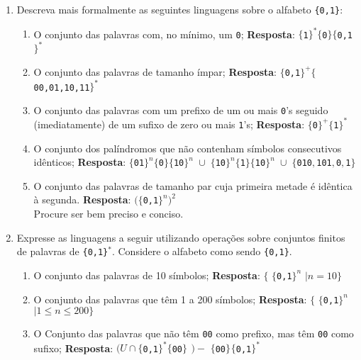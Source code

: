 \documentclass[a4paper,12pt]{article}
\newcommand{\alfabeto}[3][\ast]{$\{$#2#3$\}^{#1}$}
\newcommand{\abimpar}[4][\ast]{$\{$#2$\}^{#1}\{$#3$\}\{$#4$\}^{#1}$}
\begin{document}
\begin{enumerate}
	\item Descreva mais formalmente as seguintes linguagens sobre o alfabeto \texttt{\{0,1\}}:
	\begin{enumerate}
 		\item O conjunto das palavras com, no mínimo, um \texttt{0};
		\newline \textbf{Resposta}: \texttt{$\{$1$\}^{\ast}\{$0$\}\{$0,1$\}^{\ast}$   }
  		\item O conjunto das palavras de tamanho ímpar;
		\newline \textbf{Resposta}: \texttt{$\{$0,1$\}^{+}\{$00,01,10,11$\}^{\ast}$   }
  		\item O conjunto das palavras com um prefixo de um ou mais \texttt{0}'s seguido (imediatamente) de um sufixo de zero ou mais \texttt{1}'s;
  		\newline \textbf{Resposta}: \texttt{$\{$0$\}^{+}\{$1$\}^{\ast}$   }
		\item O conjunto dos palíndromos que não contenham símbolos consecutivos idênticos;
		\newline \textbf{Resposta}: \texttt{\abimpar[n]{01}{0}{10} $\cup$ \abimpar[n]{10}{1}{10} $\cup$ $ \{$010$,$101$,$0$,$1$\}$  }
  		\item O conjunto das palavras de tamanho par cuja primeira metade é idêntica à segunda.
		\newline \textbf{Resposta}: \texttt{$($\alfabeto[n]{0,}{1}$)^{2}$}
		\\
  		Procure ser bem preciso e conciso.
 	\end{enumerate}
 	\item  Expresse as linguagens a seguir utilizando operações sobre conjuntos finitos de palavras de \texttt{\{0,1\}$^{\ast}$}. Considere o alfabeto como sendo \texttt{\{0,1\}}.
 	\begin{enumerate}
		\item O conjunto das palavras de 10 símbolos;
		\newline \textbf{Resposta}: $\{$ \texttt{\alfabeto[n]{0,}{1}} $\mid n = 10 \}$
		\item O conjunto das palavras que têm 1 a 200 símbolos;
		\newline \textbf{Resposta}: $\{$ \texttt{\alfabeto[n]{0,}{1}} $\mid 1 \leq n \leq 200 \}$
		\item O Conjunto das palavras que não têm \texttt{00} como prefixo, mas têm \texttt{00} como sufixo;
		\newline \textbf{Resposta}: $( U \cap $\texttt{\alfabeto{0,}{1}\alfabeto[]{00}{}} $) -$ \texttt{\alfabeto[]{00}{}\alfabeto{0,}{1}}

\end{enumerate}
\end{enumerate}
\end{document}
